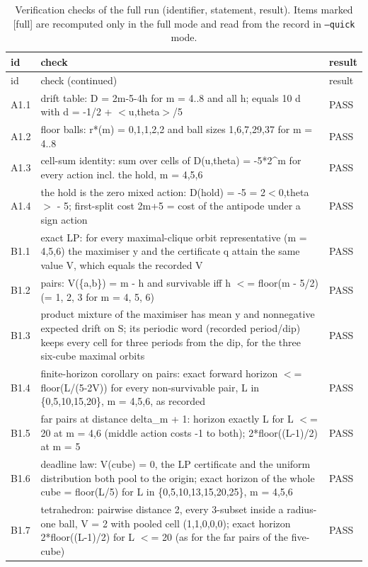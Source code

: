 \begin{longtable}{@{}l p{} l@{}}
\caption{Verification checks of the full run (identifier, statement, result). Items marked [full] are recomputed only in the full mode and read from the record in \texttt{--quick} mode.}\label{tab:S8checks}\\
\toprule id & check & result\\ \midrule
\endfirsthead
\toprule id & check (continued) & result\\ \midrule
\endhead
\bottomrule
\endfoot
A1.1 & drift table: D = 2m-5-4h for m = 4..8 and all h; equals 10 d with d = -1/2 + $<$u,theta$>$/5 & PASS\\
A1.2 & floor balls: r*(m) = 0,1,1,2,2 and ball sizes 1,6,7,29,37 for m = 4..8 & PASS\\
A1.3 & cell-sum identity: sum over cells of D(u,theta) = -5*2\^{}m for every action incl. the hold, m = 4,5,6 & PASS\\
A1.4 & the hold is the zero mixed action: D(hold) = -5 = 2$<$0,theta$>$ - 5; first-split cost 2m+5 = cost of the antipode under a sign action & PASS\\
B1.1 & exact LP: for every maximal-clique orbit representative (m = 4,5,6) the maximiser y and the certificate q attain the same value V, which equals the recorded V & PASS\\
B1.2 & pairs: V(\{a,b\}) = m - h and survivable iff h $<$= floor(m - 5/2) (= 1, 2, 3 for m = 4, 5, 6) & PASS\\
B1.3 & product mixture of the maximiser has mean y and nonnegative expected drift on S; its periodic word (recorded period/dip) keeps every cell for three periods from the dip, for the three six-cube maximal orbits & PASS\\
B1.4 & finite-horizon corollary on pairs: exact forward horizon $<$= floor(L/(5-2V)) for every non-survivable pair, L in \{0,5,10,15,20\}, m = 4,5,6, as recorded & PASS\\
B1.5 & far pairs at distance delta\_m + 1: horizon exactly L for L $<$= 20 at m = 4,6 (middle action costs -1 to both); 2*floor((L-1)/2) at m = 5 & PASS\\
B1.6 & deadline law: V(cube) = 0, the LP certificate and the uniform distribution both pool to the origin; exact horizon of the whole cube = floor(L/5) for L in \{0,5,10,13,15,20,25\}, m = 4,5,6 & PASS\\
B1.7 & tetrahedron: pairwise distance 2, every 3-subset inside a radius-one ball, V = 2 with pooled cell (1,1,0,0,0); exact horizon 2*floor((L-1)/2) for L $<$= 20 (as for the far pairs of the five-cube) & PASS\\

\end{longtable}
